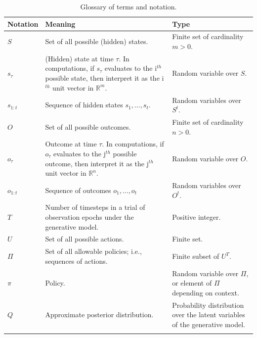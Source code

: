 \documentclass[review,12pt,authoryear]{elsarticle}
\begin{document}
\begin{longtabu} to \textwidth {
    X[1,c]
    X[4,c]
    X[3,c]}
    \caption{Glossary of terms and notation.} \label{table:2} \\
            \toprule
            Notation & Meaning & Type \\
            \midrule
$S$ &	Set of all possible (hidden) states. & Finite set of cardinality $m>0$.\\\addlinespace[0.3cm]

$s_\tau$ & (Hidden) state at time $\tau$. In computations, if $s_\tau$ evaluates to the i$^{th}$ possible state, then interpret it as the i$^{th}$ unit vector in $\mathbb R^m$. &
Random variable over $S$. \\\addlinespace[0.3cm]

$s_{1:t}$ & Sequence of hidden states $s_1,...,s_t$. & Random variables over $S^t$. \\\addlinespace[0.3cm]

$O$ &	Set of all possible outcomes. &	Finite set of cardinality $n>0$.\\\addlinespace[0.3cm]

$o_\tau$& Outcome at time $\tau$. In computations, if $o_\tau$ evaluates to the j$^{th}$ possible outcome, then interpret it as the j$^{th}$ unit vector in $\mathbb R^n$. &
Random variable over $O$. \\\addlinespace[0.3cm]

$o_{1:t}$ & Sequence of outcomes $o_1,...,o_t$ & Random variables over $O^t$.\\\addlinespace[0.3cm]
 
$T$ & Number of timesteps in a trial of observation epochs under the generative model. & Positive integer. \\\addlinespace[0.3cm]

$U$ & Set of all possible actions. & Finite set.\\\addlinespace[0.3cm]
 
$\Pi$ & Set of all allowable policies; i.e., sequences of actions. & Finite subset of $U^T$. \\\addlinespace[0.3cm]

$\pi$ & Policy. & Random variable over $\Pi$, or element of $\Pi$ depending on context. \\\addlinespace[0.3cm]

$Q$ & Approximate posterior distribution. & Probability distribution over the latent variables of the generative model.\\\addlinespace[0.3cm]
 

\end{longtabu}
\end{document}
